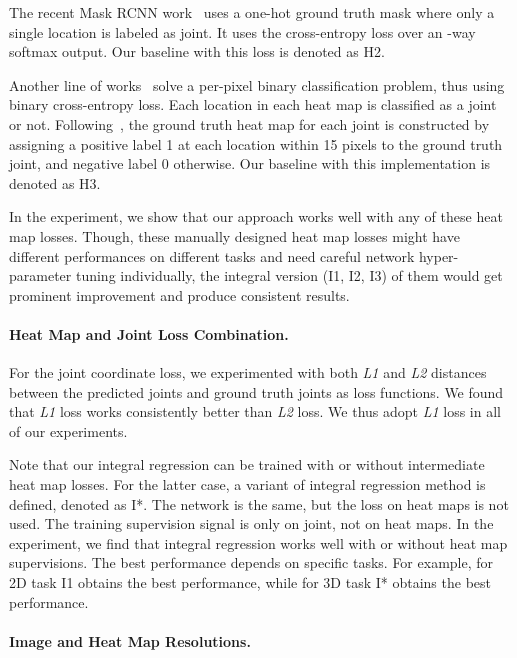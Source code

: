 \documentclass[runningheads]{llncs}
\begin{document}
The recent Mask RCNN work~\cite{he2017mask} uses a one-hot  ground truth mask where only a single location is labeled as joint. It uses the cross-entropy loss over an -way softmax output. Our baseline with this loss is denoted as H2.

Another line of works~\cite{pishchulin2016deepcut,insafutdinov2016deepercut,papandreou2017towards} solve a per-pixel binary classification problem, thus using binary cross-entropy loss. Each location in each heat map is classified as a joint or not. Following~\cite{pishchulin2016deepcut,insafutdinov2016deepercut}, the ground truth heat map for each joint is constructed by assigning a positive label 1 at each location within 15 pixels to the ground truth joint, and negative label 0 otherwise. Our baseline with this implementation is denoted as H3.

In the experiment, we show that our approach works well with any of these heat map losses. Though, these manually designed heat map losses might have different performances on different tasks and need careful network hyper-parameter tuning individually, the integral version (I1, I2, I3) of them would get prominent improvement and produce consistent results.

\paragraph{\textbf{Heat Map and Joint Loss Combination.}}

For the joint coordinate loss, we experimented with both \emph{L1} and \emph{L2} distances between the predicted joints and ground truth joints as loss functions. We found that \emph{L1} loss works consistently better than \emph{L2} loss. We thus adopt \emph{L1} loss in all of our experiments. 

Note that our integral regression can be trained with or without intermediate heat map losses. For the latter case, a variant of integral regression method is defined, denoted as I*. The network is the same, but the loss on heat maps is not used. The training supervision signal is only on joint, not on heat maps. In the experiment, we find that integral regression works well with or without heat map supervisions. The best performance depends on specific tasks. For example, for 2D task I1 obtains the best performance, while for 3D task I* obtains the best performance.

\paragraph{\textbf{Image and Heat Map Resolutions.}} 
\end{document}
